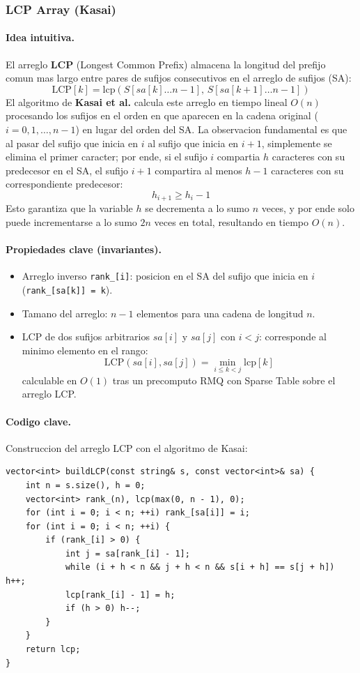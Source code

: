 \subsubsection{LCP Array (Kasai)}

\paragraph{Idea intuitiva.}
El arreglo \textbf{LCP} (Longest Common Prefix) almacena la longitud del prefijo comun mas largo entre pares de sufijos consecutivos en el arreglo de sufijos (SA):
\[
\text{LCP}[k] = \text{lcp}(S[sa[k] \dots n-1], \, S[sa[k+1] \dots n-1])
\]
El algoritmo de \textbf{Kasai et al.} calcula este arreglo en tiempo lineal $O(n)$ procesando los sufijos en el orden en que aparecen en la cadena original ($i = 0, 1, \dots, n-1$) en lugar del orden del SA. La observacion fundamental es que al pasar del sufijo que inicia en $i$ al sufijo que inicia en $i+1$, simplemente se elimina el primer caracter; por ende, si el sufijo $i$ compartia $h$ caracteres con su predecesor en el SA, el sufijo $i+1$ compartira al menos $h - 1$ caracteres con su correspondiente predecesor:
\[
h_{i+1} \ge h_i - 1
\]
Esto garantiza que la variable $h$ se decrementa a lo sumo $n$ veces, y por ende solo puede incrementarse a lo sumo $2n$ veces en total, resultando en tiempo $O(n)$.

\paragraph{Propiedades clave (invariantes).}
\begin{itemize}\setlength\itemsep{0pt}
	\item Arreglo inverso \texttt{rank\_[i]}: posicion en el SA del sufijo que inicia en $i$ (\verb|rank_[sa[k]] = k|).
	\item Tamano del arreglo: $n - 1$ elementos para una cadena de longitud $n$.
	\item LCP de dos sufijos arbitrarios $sa[i]$ y $sa[j]$ con $i < j$: corresponde al minimo elemento en el rango:
	\[
	\text{LCP}(sa[i], sa[j]) = \min_{i \le k < j} \text{lcp}[k]
	\]
	calculable en $O(1)$ tras un precomputo RMQ con Sparse Table sobre el arreglo LCP.
\end{itemize}

\paragraph{Codigo clave.}
Construccion del arreglo LCP con el algoritmo de Kasai:
\begin{verbatim}
vector<int> buildLCP(const string& s, const vector<int>& sa) {
    int n = s.size(), h = 0;
    vector<int> rank_(n), lcp(max(0, n - 1), 0);
    for (int i = 0; i < n; ++i) rank_[sa[i]] = i;
    for (int i = 0; i < n; ++i) {
        if (rank_[i] > 0) {
            int j = sa[rank_[i] - 1];
            while (i + h < n && j + h < n && s[i + h] == s[j + h]) h++;
            lcp[rank_[i] - 1] = h;
            if (h > 0) h--;
        }
    }
    return lcp;
}
\end{verbatim}

